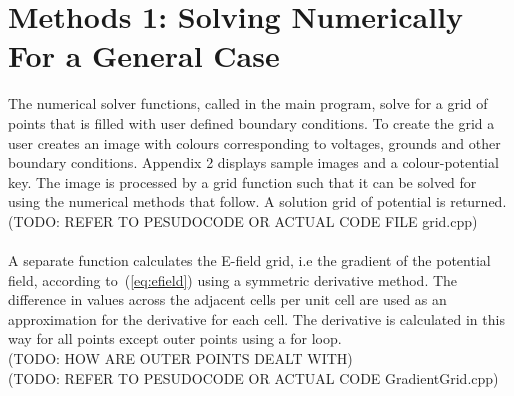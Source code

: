 \documentclass{article}
\begin{document}
\section{Methods 1: Solving Numerically For a General Case}
 The numerical solver functions, called in the main program, solve for a grid of points that is filled with user defined boundary conditions. To create the grid a user creates an image with colours corresponding to voltages, grounds and other boundary conditions. Appendix 2 displays sample images and a colour-potential key. The image is processed by a grid function such that it can be solved for using the numerical methods that follow. A solution grid of potential is returned. \\
(TODO: REFER TO PESUDOCODE OR ACTUAL CODE FILE grid.cpp) \\ 
\\
A separate function calculates the E-field grid, i.e the gradient of the potential field, according to~(\ref{eq:efield}) using a symmetric derivative method. The difference in values across the adjacent cells per unit cell are used as an approximation for the derivative for each cell. The derivative is calculated in this way for all points except outer points using a for loop.\\
(TODO: HOW ARE OUTER POINTS DEALT WITH)
\\
(TODO: REFER TO PESUDOCODE OR ACTUAL CODE GradientGrid.cpp) \\
 \\
\\
\end{document}
